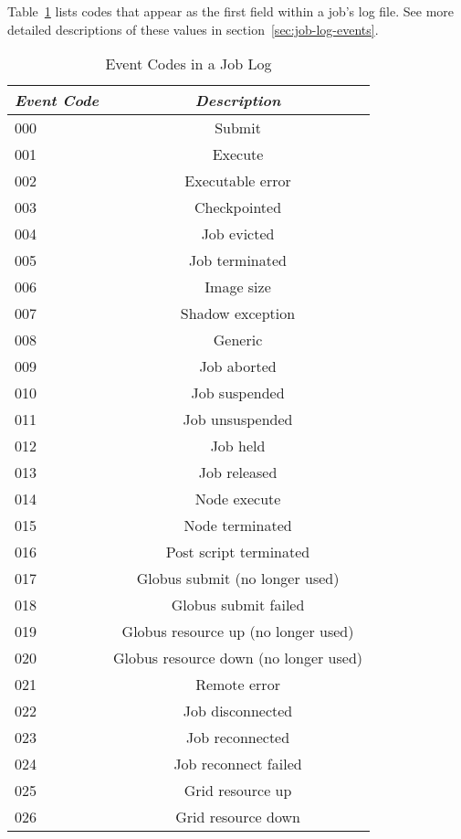 Table~\ref{table:user-log-event-codes} lists codes that appear as 
the first field within a job's log file.
See more detailed descriptions of these values in
section~\ref{sec:job-log-events}.
\begin{center}
\begin{table}[H]
\caption{\label{table:user-log-event-codes}Event Codes in a Job Log}
\begin{tabular}{|l|c|} \hline
\emph{Event Code} & \emph{Description}   \\ \hline \hline
000   &   Submit  \\ \hline
001   &   Execute  \\ \hline
002   &   Executable error  \\ \hline
003   &   Checkpointed  \\ \hline
004   &   Job evicted  \\ \hline
005   &   Job terminated  \\ \hline
006   &   Image size  \\ \hline
007   &   Shadow exception  \\ \hline
008   &   Generic  \\ \hline
009   &   Job aborted  \\ \hline
010  &   Job suspended  \\ \hline
011  &   Job unsuspended  \\ \hline
012  &   Job held  \\ \hline
013  &   Job released  \\ \hline
014  &   Node execute  \\ \hline
015  &   Node terminated  \\ \hline
016  &   Post script terminated  \\ \hline
017  &   Globus submit (no longer used)  \\ \hline
018  &   Globus submit failed  \\ \hline
019  &   Globus resource up (no longer used)  \\ \hline
020  &   Globus resource down (no longer used)  \\ \hline
021  &   Remote error  \\ \hline
022  &   Job disconnected  \\ \hline
023  &   Job reconnected  \\ \hline
024  &   Job reconnect failed  \\ \hline
025  &   Grid resource up \\ \hline
026  &   Grid resource down \\ \hline

\end{tabular}
\end{table}
\end{center}
